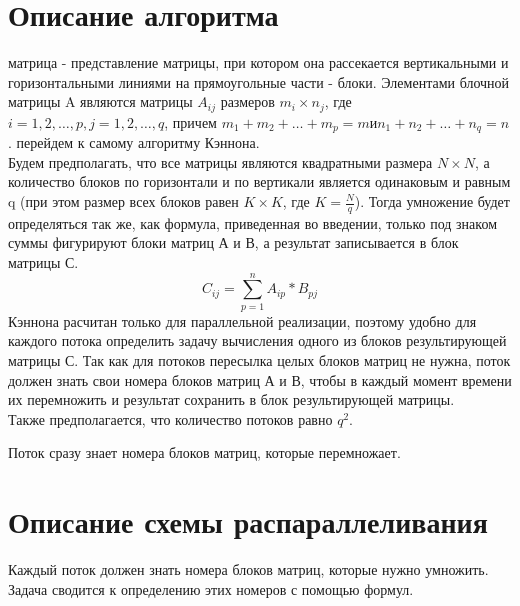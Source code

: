 \documentclass{report}
\begin{document}
\section*{Описание алгоритма}
 матрица - представление матрицы, при котором она рассекается вертикальными и горизонтальными линиями на прямоугольные части - блоки. Элементами блочной матрицы A являются матрицы $A_{ij}$ размеров $m_i\times n_j$, где $i=1,2,\ldots,p, j=1,2,\ldots,q$, причем $m_1+m_2+\ldots+m_p=m и n_1+n_2+\ldots+n_q=n$.
 перейдем к самому алгоритму Кэннона.\\
Будем предполагать, что все матрицы являются квадратными размера $N\times N$, а количество блоков по горизонтали и по вертикали является одинаковым и равным q (при этом размер всех блоков равен $K\times K$, где $K = \frac{N}{q}$). Тогда умножение будет определяться так же, как формула, приведенная во введении, только под знаком суммы фигурируют блоки матриц А и В, а результат записывается в блок матрицы С.\\
\begin{equation}\label{eq:multblock}
C_{ij} =  \sum \limits_{p=1}^{n} A_{ip} * B_{pj}
\end{equation}
 Кэннона расчитан только для параллельной реализации, поэтому удобно для каждого потока определить задачу вычисления одного из блоков результирующей матрицы С. Так как для потоков пересылка целых блоков матриц не нужна, поток должен знать свои номера блоков матриц А и В, чтобы в каждый момент времени их перемножить и результат сохранить в блок результирующей матрицы.\\
Также предполагается, что количество потоков равно $q^2$.

Поток сразу знает номера блоков матриц, которые перемножает.

\newpage

\section*{Описание схемы распараллеливания}
Каждый поток должен знать номера блоков матриц, которые нужно умножить. Задача сводится к определению этих номеров с помощью формул.
\end{document}
